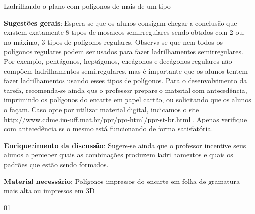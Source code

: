 \begin{sugestions}{Ladrilhando o plano com polígonos de mais de um tipo}
{
	\textbf{Sugestões gerais}: Espera-se que os alunos consigam chegar à conclusão que existem exatamente 8 tipos de mosaicos semirregulares sendo obtidos com 2 ou, no máximo, 3 tipos de polígonos regulares. Observa-se que nem todos os polígonos regulares podem ser usados para fazer ladrilhamentos semirregulares. Por exemplo, pentágonos, heptágonos, eneágonos e decágonos regulares não compõem ladrilhamentos semirregulares, mas é importante que os alunos tentem fazer ladrilhamentos usando esses tipos de polígonos. 
	Para o desenvolvimento da tarefa, recomenda-se ainda que o professor prepare o material com antecedência, imprimindo os polígonos do encarte em papel cartão, ou solicitando que os alunos o façam. Caso opte por utilizar material digital, indicamos o site http://www.cdme.im-uff.mat.br/ppr/ppr-html/ppr-st-br.html . Apenas verifique com antecedência se o mesmo está funcionando de forma satisfatória. 
	 
	\textbf{Enriquecimento da discussão}: Sugere-se ainda que o professor incentive seus alunos a perceber quais as combinações produzem ladrilhamentos e quais os padrões que estão sendo formados.

	\textbf{Material necessário}: Polígonos impressos do encarte em folha de gramatura mais alta ou impressos em 3D	
}{0}{1}
\end{sugestions}




